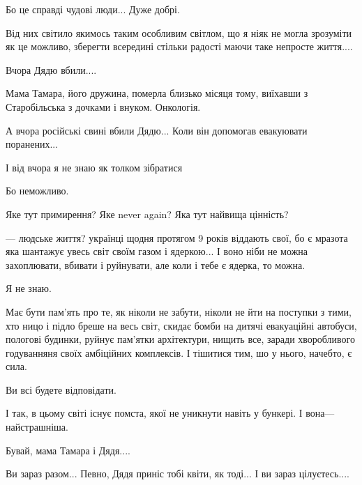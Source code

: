 Бо це справді чудові люди... Дуже добрі.

Від них світило якимось таким особливим світлом, що я ніяк не могла зрозуміти
як це можливо, зберегти всередині стільки радості маючи таке непросте життя....

Вчора Дядю вбили....

Мама Тамара, його дружина, померла близько місяця тому, виїхавши з
Старобільська з дочками і внуком. Онкологія.

А вчора російські свині вбили Дядю... Коли він допомогав евакуювати
поранених...

І від вчора я не знаю як толком зібратися

Бо неможливо.

Яке тут примирення? Яке never again? Яка тут найвища цінність? 

—  людське життя? українці щодня протягом 9 років віддають свої, бо є мразота
яка шантажує увесь світ своїм газом і ядеркою... І воно ніби не можна
захоплювати, вбивати і руйнувати, але коли і тебе є ядерка, то можна. 

Я не знаю.

Має бути пам'ять про те, як ніколи не забути, ніколи не йти на поступки з тими,
хто ницо і підло бреше на весь світ, скидає бомби на дитячі евакуаційні
автобуси, пологові будинки, руйнує пам'ятки архітектури, нищить все, заради
хворобливого годуванняня своїх амбіційних комплексів. І тішитися тим,  шо у
нього, начебто, є сила.

Ви всі будете відповідати.

І так, в цьому світі існує помста, якої не уникнути навіть у бункері. І вона—
найстрашніша.

Бувай, мама Тамара і Дядя....

Ви зараз разом... Певно, Дядя приніс тобі квіти, як тоді... І ви зараз
цілуєтесь....

